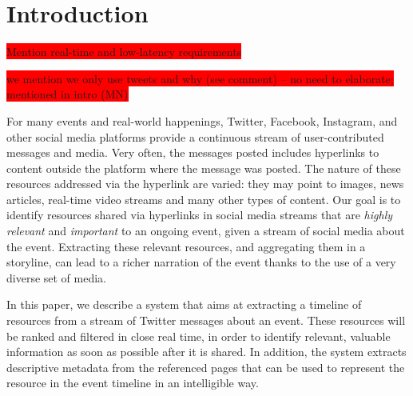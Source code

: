 \documentclass{sig-alternate}
\newcommand{\todo}[1]{\colorbox{red}{#1}}
\begin{document}


\section{Introduction}
\label{sec:introduction}

\todo{Mention real-time and low-latency requirements}

\todo{we mention we only use tweets and why (see comment) -- no need to elaborate; mentioned in intro (MN)}



For many events and real-world happenings, Twitter, Facebook, Instagram, and other social media platforms provide a continuous stream of user-contributed messages and media. Very often, the messages posted includes hyperlinks to content outside the platform where the message was posted. The nature of these resources addressed via the hyperlink are varied: they may point to images, news articles, real-time video streams and many other types of content. Our goal is to identify resources shared via hyperlinks in social media streams that are \emph{highly relevant} and \emph{important} to an ongoing event, given a stream of social media about the event. Extracting these relevant resources, and aggregating them in a storyline, can lead to a richer narration of the event thanks to the use of a very diverse set of media.

In this paper, we describe a system that aims at extracting a timeline of resources from a stream of Twitter messages about an event. These resources will be ranked and filtered in close real time, in order to identify relevant, valuable information as soon as possible after it is shared. In addition, the system extracts descriptive metadata from the referenced pages that can be used to represent the resource in the event timeline in an intelligible way. 
\end{document}
